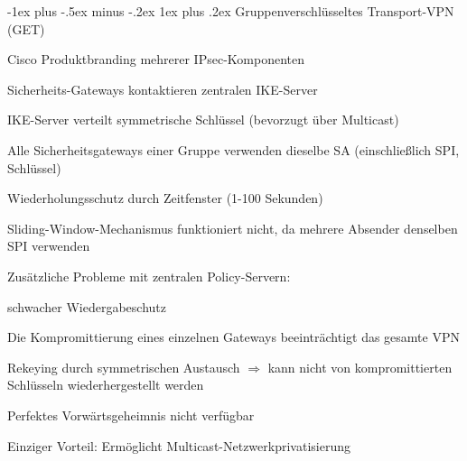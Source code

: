 \documentclass[a4paper]{article}
\makeatletter
\renewcommand{\subsubsection}{\@startsection{subsubsection}{3}{0mm}%
 {-1ex plus -.5ex minus -.2ex}%
 {1ex plus .2ex}%
 {\normalfont\small\bfseries}}
\makeatother
\begin{document}
\begin{multicols}{3}
      \subsubsection{Gruppenverschlüsseltes Transport-VPN (GET)}
      \begin{itemize*}
            \item Cisco Produktbranding mehrerer IPsec-Komponenten
            \item Sicherheits-Gateways kontaktieren zentralen IKE-Server
            \item IKE-Server verteilt symmetrische Schlüssel (bevorzugt über Multicast)
            \item Alle Sicherheitsgateways einer Gruppe verwenden dieselbe SA (einschließlich SPI, Schlüssel)
            \item Wiederholungsschutz durch Zeitfenster (1-100 Sekunden)
            \begin{itemize*}
                  \item Sliding-Window-Mechanismus funktioniert nicht, da mehrere Absender denselben SPI verwenden
            \end{itemize*}
            \item Zusätzliche Probleme mit zentralen Policy-Servern:
            \begin{itemize*}
                  \item schwacher Wiedergabeschutz
                  \item Die Kompromittierung eines einzelnen Gateways beeinträchtigt das gesamte VPN
                  \item Rekeying durch symmetrischen Austausch $\Rightarrow$ kann nicht von kompromittierten Schlüsseln wiederhergestellt werden
                  \item Perfektes Vorwärtsgeheimnis nicht verfügbar
            \end{itemize*}
            \item Einziger Vorteil: Ermöglicht Multicast-Netzwerkprivatisierung
      \end{itemize*}


\end{multicols}
\end{document}
